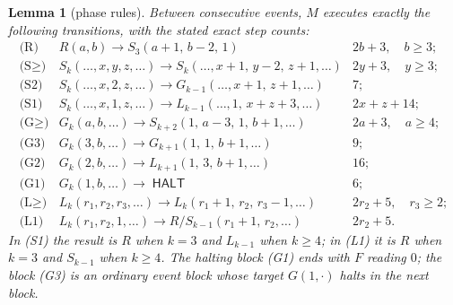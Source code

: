 \documentclass[11pt]{amsart}
\newtheorem{lemma}[theorem]{Lemma}
\theoremstyle{definition}
\DeclareMathOperator{\HALT}{\textsf{HALT}}
\begin{document}
\begin{lemma}[phase rules]\label{lem:rules}
Between consecutive events, $M$ executes exactly the following transitions,
with the stated exact step counts:
\[
\begin{array}{llc}
\text{(R)} & R(a,b)\to S_3(a{+}1,\,b{-}2,\,1) & 2b+3,\quad b\ge3;\\[2pt]
\text{(S$\ge$)} & S_k(\dots,x,y,z,\dots)\to S_k(\dots,x{+}1,\,y{-}2,\,z{+}1,\dots) & 2y+3,\quad y\ge3;\\[2pt]
\text{(S2)} & S_k(\dots,x,2,z,\dots)\to G_{k-1}(\dots,x{+}1,\,z{+}1,\dots) & 7;\\[2pt]
\text{(S1)} & S_k(\dots,x,1,z,\dots)\to L_{k-1}(\dots,1,\,x{+}z{+}3,\dots) & 2x+z+14;\\[2pt]
\text{(G$\ge$)} & G_k(a,b,\dots)\to S_{k+2}(1,\,a{-}3,\,1,\,b{+}1,\dots) & 2a+3,\quad a\ge4;\\[2pt]
\text{(G3)} & G_k(3,b,\dots)\to G_{k+1}(1,\,1,\,b{+}1,\dots) & 9;\\[2pt]
\text{(G2)} & G_k(2,b,\dots)\to L_{k+1}(1,\,3,\,b{+}1,\dots) & 16;\\[2pt]
\text{(G1)} & G_k(1,b,\dots)\to \HALT & 6;\\[2pt]
\text{(L$\ge$)} & L_k(r_1,r_2,r_3,\dots)\to L_k(r_1{+}1,\,r_2,\,r_3{-}1,\dots) & 2r_2+5,\quad r_3\ge2;\\[2pt]
\text{(L1)} & L_k(r_1,r_2,1,\dots)\to R/S_{k-1}(r_1{+}1,\,r_2,\dots) & 2r_2+5.
\end{array}
\]
In (S1) the result is $R$ when $k=3$ and $L_{k-1}$ when $k\ge4$; in (L1) it
is $R$ when $k=3$ and $S_{k-1}$ when $k\ge4$. The halting block (G1) ends
with $F$ reading $0$; the block (G3) is an ordinary event block whose target
$G(1,\cdot)$ halts in the next block.
\end{lemma}
\end{document}
